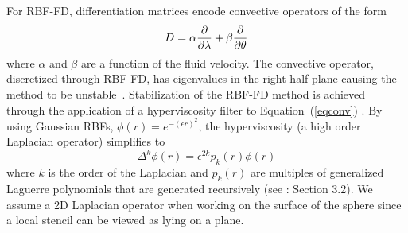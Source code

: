 \documentclass{report}
\begin{document}
{For RBF-FD, differentiation matrices encode convective operators of the form 
\begin{equation}
D = \alpha \frac{\partial }{\partial \lambda} + \beta \frac{\partial }{\partial \theta} \label{eqconv}
\end{equation}
where $\alpha$ and $\beta$ are a function of the fluid velocity. The convective operator, discretized
through RBF-FD, has eigenvalues 
 in the right half-plane causing the method to be unstable~\cite{FornbergLehto11, FlyerLehto11}. 
Stabilization of the RBF-FD method is achieved through the application of a hyperviscosity filter 
to Equation~(\ref{eqconv}) \cite{FornbergLehto11}. By using Gaussian 
 RBFs, $\phi(r) = e^{-(\epsilon r)^2}$, the hyperviscosity (a high order Laplacian operator) simplifies to
\begin{equation}
\Delta^{k}\phi(r) = \epsilon^{2k} p_k(r) \phi(r)
\label{eqn:gaussian_hv}
\end{equation}
where $k$ is the order of the Laplacian and  $p_k(r)$ are multiples of generalized Laguerre polynomials that
are generated recursively (see \cite{FornbergLehto11}: Section 3.2). We assume a 2D  Laplacian operator 
when working on the surface of the sphere since a local stencil can be viewed as lying on a plane.


}
\end{document}

